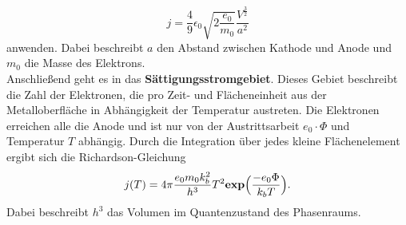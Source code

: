 \begin{equation}
  j = \frac{4}{9} \epsilon_0 \sqrt{2\frac{e_0}{m_0}} \frac{V^\frac{3}{2}}{a^2}
  \label{eq:2}
\end{equation}
anwenden. Dabei beschreibt $a$ den Abstand zwischen Kathode und Anode und $m_0$ die Masse des Elektrons.\\
Anschließend geht es in das \textbf{Sättigungsstromgebiet}. Dieses Gebiet beschreibt die Zahl der Elektronen, die pro
Zeit- und Flächeneinheit aus der Metalloberfläche in Abhängigkeit der Temperatur austreten.
Die Elektronen erreichen alle die Anode und ist nur von der Austrittsarbeit $e_0 \cdot \Phi$ und Temperatur $T$
abhängig.
Durch die Integration über jedes kleine Flächenelement ergibt sich die Richardson-Gleichung
\begin{equation}
  j(T) = 4 \pi \frac{e_0 m_0 k_b^2}{h^3} T^2 \textbf{exp}\Bigl(\frac{-e_0 \Phi}{k_bT}\Bigr).
  \label{eq:3}
\end{equation}
Dabei beschreibt $h^3$ das Volumen im Quantenzustand des Phasenraums.
